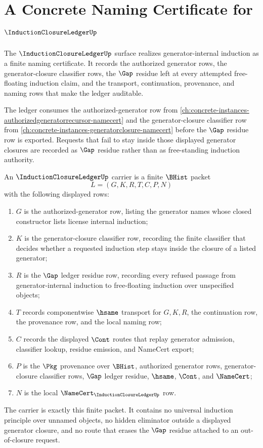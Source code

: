 \chapter{A Concrete Naming Certificate for $\InductionClosureLedgerUp$}
\label{ch:concrete-instances-inductionclosureledger-namecert}

The $\InductionClosureLedgerUp$ surface realizes generator-internal induction as a finite naming certificate. It records the authorized generator rows, the generator-closure classifier rows, the $\Gap$ residue left at every attempted free-floating induction claim, and the transport, continuation, provenance, and naming rows that make the ledger auditable.

The ledger consumes the authorized-generator row from \autoref{ch:concrete-instances-authorizedgeneratorrecursor-namecert} and the generator-closure classifier row from \autoref{ch:concrete-instances-generatorclosure-namecert} before the $\Gap$ residue row is exported. Requests that fail to stay inside those displayed generator closures are recorded as $\Gap$ residue rather than as free-standing induction authority.

\begin{definition}
\label{def:induction-closure-ledger-carrier}
An $\InductionClosureLedgerUp$ carrier is a finite $\BHist$ packet
$$
L=(G,K,R,T,C,P,N)
$$
with the following displayed rows:
\begin{enumerate}
\item $G$ is the authorized-generator row, listing the generator names whose closed constructor lists license internal induction;
\item $K$ is the generator-closure classifier row, recording the finite classifier that decides whether a requested induction step stays inside the closure of a listed generator;
\item $R$ is the $\Gap$ ledger residue row, recording every refused passage from generator-internal induction to free-floating induction over unspecified objects;
\item $T$ records componentwise $\hsame$ transport for $G,K,R$, the continuation row, the provenance row, and the local naming row;
\item $C$ records the displayed $\Cont$ routes that replay generator admission, classifier lookup, residue emission, and NameCert export;
\item $P$ is the $\Pkg$ provenance over $\BHist$, authorized generator rows, generator-closure classifier rows, $\Gap$ ledger residue, $\hsame$, $\Cont$, and $\NameCert$;
\item $N$ is the local $\NameCert_{\InductionClosureLedgerUp}$ row.
\end{enumerate}
The carrier is exactly this finite packet. It contains no universal induction principle over unnamed objects, no hidden eliminator outside a displayed generator closure, and no route that erases the $\Gap$ residue attached to an out-of-closure request.
\end{definition}

